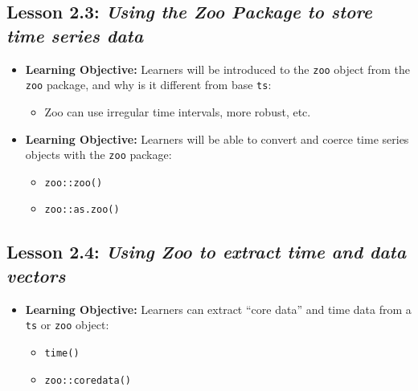 \documentclass[
]{book}
\providecommand{\tightlist}{%
  \setlength{\itemsep}{0pt}\setlength{\parskip}{0pt}}
\begin{document}
\hypertarget{lesson-2.3-using-the-zoo-package-to-store-time-series-data}{%
\subsection*{\texorpdfstring{Lesson 2.3: \emph{Using the Zoo Package to store time series data}}{Lesson 2.3: Using the Zoo Package to store time series data}}\label{lesson-2.3-using-the-zoo-package-to-store-time-series-data}}

\begin{itemize}
\tightlist
\item
  \textbf{Learning Objective:} Learners will be introduced to the \texttt{zoo} object from the \texttt{zoo} package, and why is it different from base \texttt{ts}:

  \begin{itemize}
  \tightlist
  \item
    Zoo can use irregular time intervals, more robust, etc.
  \end{itemize}
\item
  \textbf{Learning Objective:} Learners will be able to convert and coerce time series objects with the \texttt{zoo} package:

  \begin{itemize}
  \tightlist
  \item
    \texttt{zoo::zoo()}
  \item
    \texttt{zoo::as.zoo()}
  \end{itemize}
\end{itemize}

\hypertarget{lesson-2.4-using-zoo-to-extract-time-and-data-vectors}{%
\subsection*{\texorpdfstring{Lesson 2.4: \emph{Using Zoo to extract time and data vectors}}{Lesson 2.4: Using Zoo to extract time and data vectors}}\label{lesson-2.4-using-zoo-to-extract-time-and-data-vectors}}

\begin{itemize}
\tightlist
\item
  \textbf{Learning Objective:} Learners can extract ``core data'' and time data from a \texttt{ts} or \texttt{zoo} object:

  \begin{itemize}
  \tightlist
  \item
    \texttt{time()}
  \item
    \texttt{zoo::coredata()}
  \end{itemize}
\end{itemize}
\end{document}
